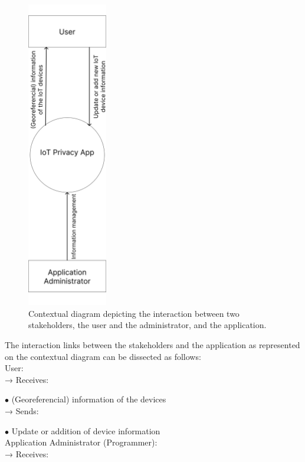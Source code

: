 \begin{figure}[H]
    \centering
    \includegraphics[width=3.5cm]{../app/docs/software_requirements/assets/images/contextual_diagram.png}
    \caption{Contextual diagram depicting the interaction between two stakeholders, the user and the administrator, and the application.}
    \label{fig:contextual diagram}
\end{figure}

The interaction links between the stakeholders and the application as represented
on the contextual diagram can be dissected as follows:\\
\newline
User: \\
\newline
→ Receives:

$\bullet$ (Georeferencial) information of the \hyperlink{\acronym}{\acronym} devices\\
\newline
→ Sends:

$\bullet$ Update or addition of \hyperlink{\acronym}{\acronym} device information\\
\newline
Application Administrator (Programmer): \\
\newline
→ Receives:

